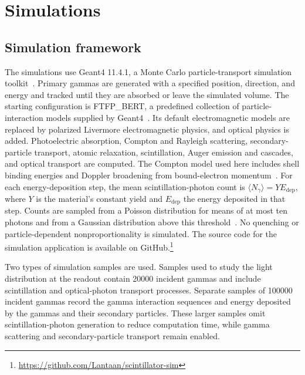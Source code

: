 \chapter{Simulations}
\label{chap:simulations}

\section{Simulation framework}

The simulations use Geant4 11.4.1, a Monte Carlo particle-transport simulation toolkit~\parencite[Geant4 Scope of Application]{geant4introduction}. Primary gammas are generated with a specified position, direction, and energy and tracked until they are absorbed or leave the simulated volume. The starting configuration is FTFP\_BERT, a predefined collection of particle-interaction models supplied by Geant4~\parencite{geantftfpbert}. Its default electromagnetic models are replaced by polarized Livermore electromagnetic physics, and optical physics is added.
Photoelectric absorption, Compton and Rayleigh scattering, secondary-particle transport, atomic relaxation, scintillation, Auger emission and cascades, and optical transport are computed. The Compton model used here includes shell binding energies and Doppler broadening from bound-electron momentum~\parencite{geant4polarizedcomptonsource}. For each energy-deposition step, the mean scintillation-photon count is $\langle N_\gamma\rangle=Y E_{\mathrm{dep}}$, where $Y$ is the material's constant yield and $E_{\mathrm{dep}}$ the energy deposited in that step. Counts are sampled from a Poisson distribution for means of at most ten photons and from a Gaussian distribution above this threshold~\parencite[Scintillation]{geantopticalprocesses}. No quenching or particle-dependent nonproportionality is simulated. The source code for the simulation application is available on GitHub.\footnote{\url{https://github.com/Lantaan/scintillator-sim}}

Two types of simulation samples are used. Samples used to study the light distribution at the readout contain \num{20000} incident gammas and include scintillation and optical-photon transport processes. Separate samples of \num{100000} incident gammas record the gamma interaction sequences and energy deposited by the gammas and their secondary particles. These larger samples omit scintillation-photon generation to reduce computation time, while gamma scattering and secondary-particle transport remain enabled.

